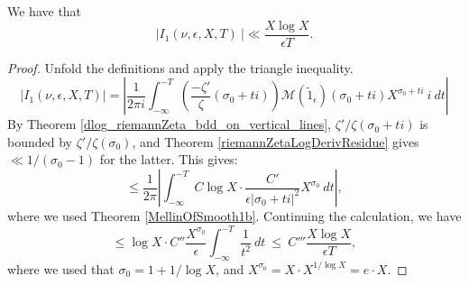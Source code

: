 \begin{lemma}[I1Bound]
\label{I1Bound}
\leanok
We have that
  $$
  \left|I_{1}(\nu, \epsilon, X, T)\
  \right| \ll \frac{X\log X}{\epsilon T}
  .
  $$
\end{lemma}
\begin{proof}
\leanok
Unfold the definitions and apply the triangle inequality.
  $$
  \left|I_{1}(\nu, \epsilon, X, T)\right| =
  \left|
  \frac{1}{2\pi i} \int_{-\infty}^{-T}
  \left(
  \frac{-\zeta'}\zeta(\sigma_0 + t i)
  \right)
   \mathcal M(\widetilde 1_\epsilon)(\sigma_0 + t i)
  X^{\sigma_0 + t i}
  \ i \ dt
  \right|
  $$
  By Theorem \ref{dlog_riemannZeta_bdd_on_vertical_lines},
  $\zeta'/\zeta (\sigma_0 + t i)$ is bounded by $\zeta'/\zeta(\sigma_0)$, and
  Theorem \ref{riemannZetaLogDerivResidue} gives $\ll 1/(\sigma_0-1)$ for the latter. This gives:
  $$
  \leq
  \frac{1}{2\pi}
  \left|
   \int_{-\infty}^{-T}
  C \log X\cdot
   \frac{C'}{\epsilon|\sigma_0 + t i|^2}
  X^{\sigma_0}
  \ dt
  \right|
  ,
  $$
  where we used Theorem \ref{MellinOfSmooth1b}.
  Continuing the calculation, we have
  $$
  \leq
  \log X \cdot
  C'' \frac{X^{\sigma_0}}{\epsilon}
  \int_{-\infty}^{-T}
  \frac{1}{t^2}
  \ dt
  \ \leq \
  C''' \frac{X\log X}{\epsilon T}
  ,
  $$
  where we used that $\sigma_0=1+1/\log X$, and $X^{\sigma_0} = X\cdot X^{1/\log X}=e \cdot X$.
\end{proof}
